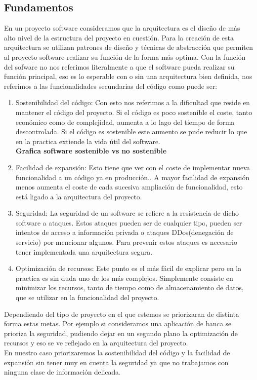 \documentclass[12pt,a4paper]{article}
\begin{document}
	\subsection{Fundamentos}
En un proyecto software consideramos que la arquitectura es el diseño de más alto nivel de la estructura del proyecto en cuestión. Para la creación de esta arquitectura se utilizan patrones de diseño y técnicas de abstracción que permiten al proyecto software realizar su función de la forma más optima. Con la función del sofware no nos referimos literalmente a que el software pueda realizar su función principal, eso es lo esperable con o sin una arquitectura bien definida, nos referimos a las funcionalidades secundarias del código como puede ser:
\begin{enumerate}
\item Sostenibilidad del código: Con esto nos referimos a la dificultad que reside en mantener el código del proyecto. Si el código es poco sostenible el coste, tanto económico como de complejidad, aumenta a lo lago del tiempo de forma descontrolada. Si el código es sostenible este aumento se pude reducir lo que en la practica extiende la vida útil del software.\\
\textbf{Grafica software sostenible vs no sostenible}\\
\item Facilidad de expansión: Esto tiene que ver con el coste de implementar nueva funcionalidad a un código ya en producción.. A mayor facilidad de expansión menos aumenta el coste de cada sucesiva ampliación de funcionalidad, esto está ligado a la arquitectura del proyecto.
\item Seguridad: La seguridad de un software se refiere a la resistencia de dicho software a ataques. Estos ataques pueden ser de cualquier tipo, pueden ser intentos de acceso a información privada o ataques DDos(denegación de servicio) por mencionar algunos. Para prevenir estos ataques es necesario tener implementada una arquitectura segura.
\item Optimización de recursos: Este punto es el más fácil de explicar pero en la practica es sin duda uno de los más complejos. Simplemente consiste en minimizar los recursos, tanto de tiempo como de almacenamiento de datos, que se utilizar en la funcionalidad del proyecto.
\end{enumerate}
Dependiendo del tipo de proyecto en el que estemos se priorizaran de distinta forma estas metas. Por ejemplo si consideramos una aplicación de banca se prioriza la seguridad, pudiendo dejar en un segundo plano la optimización de recursos y eso se ve reflejado en la arquitectura del proyecto.\\
En nuestro caso priorizaremos la sostenibilidad del código y la facilidad de expansión sin tener muy en cuenta la seguridad ya que no trabajamos con ninguna clase de información delicada.\\
\end{document}
